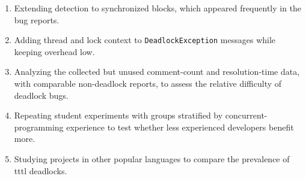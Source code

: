 \begin{enumerate}
\item Extending detection to synchronized blocks, which appeared frequently in the bug reports.
\item Adding thread and lock context to {\tt DeadlockException} messages while keeping overhead low.
\item Analyzing the collected but unused comment-count and resolution-time data, with comparable non-deadlock reports, to assess the relative difficulty of deadlock bugs.
\item Repeating student experiments with groups stratified by concurrent-programming experience to test whether less experienced developers benefit more.
\item Studying projects in other popular languages to compare the prevalence of \ac{tttl} deadlocks.
\end{enumerate}
